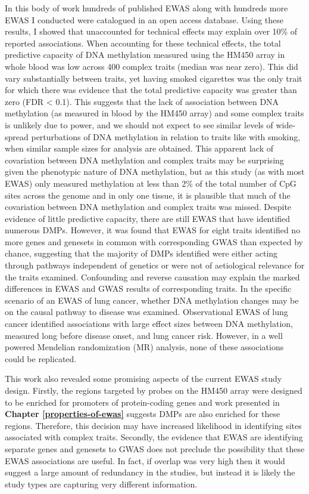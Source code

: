 \documentclass[11pt,twoside]{bristolthesis}
\begin{document}
In this body of work hundreds of published EWAS along with hundreds more EWAS I conducted were catalogued in an open access database. Using these results, I showed that unaccounted for technical effects may explain over 10\% of reported associations. When accounting for these technical effects, the total predictive capacity of DNA methylation measured using the HM450 array in whole blood was low across 400 complex traits (median was near zero). This did vary substantially between traits, yet having smoked cigarettes was the only trait for which there was evidence that the total predictive capacity was greater than zero (FDR \textless{} 0.1). This suggests that the lack of association between DNA methylation (as measured in blood by the HM450 array) and some complex traits is unlikely due to power, and we should not expect to see similar levels of wide-spread perturbations of DNA methylation in relation to traits like with smoking, when similar sample sizes for analysis are obtained. This apparent lack of covariation between DNA methylation and complex traits may be surprising given the phenotypic nature of DNA methylation, but as this study (as with most EWAS) only measured methylation at less than 2\% of the total number of CpG sites across the genome and in only one tissue, it is plausible that much of the covariation between DNA methylation and complex traits was missed. Despite evidence of little predictive capacity, there are still EWAS that have identified numerous DMPs. However, it was found that EWAS for eight traits identified no more genes and genesets in common with corresponding GWAS than expected by chance, suggesting that the majority of DMPs identified were either acting through pathways independent of genetics or were not of aetiological relevance for the traits examined. Confounding and reverse causation may explain the marked differences in EWAS and GWAS results of corresponding traits. In the specific scenario of an EWAS of lung cancer, whether DNA methylation changes may be on the causal pathway to disease was examined. Observational EWAS of lung cancer identified associations with large effect sizes between DNA methylation, measured long before disease onset, and lung cancer risk. However, in a well powered Mendelian randomization (MR) analysis, none of these associations could be replicated.

This work also revealed some promising aspects of the current EWAS study design. Firstly, the regions targeted by probes on the HM450 array were designed to be enriched for promoters of protein-coding genes and work presented in \textbf{Chapter \ref{properties-of-ewas}} suggests DMPs are also enriched for these regions. Therefore, this decision may have increased likelihood in identifying sites associated with complex traits. Secondly, the evidence that EWAS are identifying separate genes and genesets to GWAS does not preclude the possibility that these EWAS associations are useful. In fact, if overlap was very high then it would suggest a large amount of redundancy in the studies, but instead it is likely the study types are capturing very different information.
\end{document}
